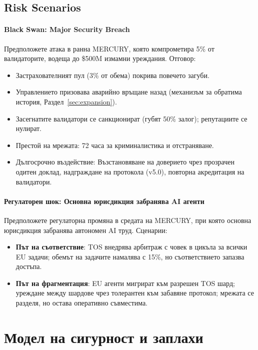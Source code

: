\documentclass[11pt]{article}
\begin{document}
\subsection{Risk Scenarios}
\paragraph{Black Swan: Major Security Breach}
Предположете атака в ранна MERCURY, която компрометира 5\% от валидаторите, водеща до \$500M измамни уреждания. Отговор:
\begin{itemize}[noitemsep]
  \item Застрахователният пул (3\% от обема) покрива повечето загуби.
  \item Управлението призовава аварийно връщане назад (механизъм за обратима история, Раздел~\ref{sec:expansion}).
  \item Засегнатите валидатори се санкционират (губят 50\% залог); репутациите се нулират.
  \item Престой на мрежата: 72 часа за криминалистика и отстраняване.
  \item Дългосрочно въздействие: Възстановяване на доверието чрез прозрачен одитен доклад, надграждане на протокола (v5.0), повторна акредитация на валидатори.
\end{itemize}

\paragraph{Регулаторен шок: Основна юрисдикция забранява AI агенти}
Предположете регулаторна промяна в средата на MERCURY, при която основна юрисдикция забранява автономен AI труд. Сценарии:
\begin{itemize}[noitemsep]
  \item \textbf{Път на съответствие}: TOS внедрява арбитраж с човек в цикъла за всички EU задачи; обемът на задачите намалява с 15\%, но съответствието запазва достъпа.
  \item \textbf{Път на фрагментация}: EU агенти мигрират към разрешен TOS шард; уреждане между шардове чрез толерантен към забавяне протокол; мрежата се разделя, но остава оперативно съвместима.
\end{itemize}

\section{Модел на сигурност и заплахи}
\label{sec:security}
\end{document}
